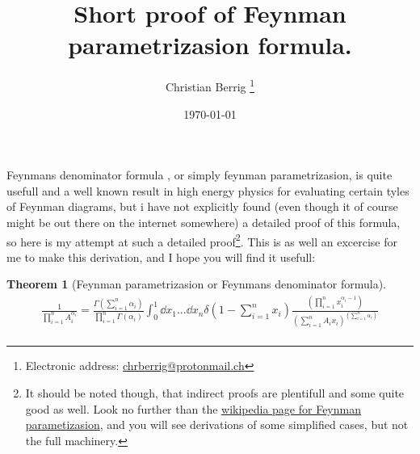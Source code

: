 \documentclass[a4paper,twoside]{article}
\title{Short proof of Feynman parametrizasion formula.}
\author[1]{Christian Berrig
\thanks{Electronic address: \href{mailto:chrberrig@protonmail.ch}{chrberrig@protonmail.ch}}
}
\affil[1]{Institute of Science and Environment, RUC}
\date{\today}
\newtheorem{theorem}{Theorem}
\begin{document}
\maketitle

Feynmans denominator formula , or simply feynman parametrizasion, is quite usefull and a well known result in high energy physics for evaluating certain tyles of Feynman diagrams, but i have not explicitly found (even though it of course might be out there on the internet somewhere) a detailed proof of this formula, so here is my attempt at such a detailed proof\footnote{It should be noted though, that indirect proofs are plentifull and some quite good as well. Look no further than the \href{https://en.wikipedia.org/wiki/Feynman_parametrization}{wikipedia page for Feynman parametizasion}, and you will see derivations of some simplified cases, but not the full machinery.}. This is as well an excercise for me to make this derivation, and I hope you will find it usefull:

\begin{theorem}[Feynman parametrizasion or Feynmans denominator formula]
\begin{align*}
\frac{1}{\prod_{i=1}^{n}A_{i}^{\alpha_{i}}}
= \frac{\Gamma \left( \sum_{i=1}^{n} \alpha_{i} \right)}{\prod_{i=1}^{n}\Gamma(\alpha_{i})}
 \int_{0}^{1} \dd{x_{1}}...\dd{x_{n}} 
\delta \left(1 - \sum_{i=1}^{n}x_{i}\right) 
\frac{\left( \prod_{i=1}^{n} x_{i}^{\alpha_{i} - 1} \right)}{\left( \sum_{i=1}^{n}A_{i}x_{i} \right)^{\left( \sum_{i=1}^{n} \alpha_{i} \right)}} \\
\end{align*}
\end{theorem}
\end{document}

